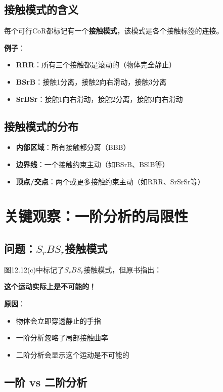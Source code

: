 \documentclass[12pt,a4paper]{article}
\begin{document}
\subsection{接触模式的含义}

每个可行CoR都标记有一个\textbf{接触模式}，该模式是各个接触标签的连接。

\textbf{例子}：
\begin{itemize}
\item \textbf{RRR}：所有三个接触都是滚动的（物体完全静止）
\item \textbf{BSrB}：接触1分离，接触2向右滑动，接触3分离
\item \textbf{SrBSr}：接触1向右滑动，接触2分离，接触3向右滑动
\end{itemize}

\subsection{接触模式的分布}

\begin{itemize}
\item \textbf{内部区域}：所有接触都分离（BBB）
\item \textbf{边界线}：一个接触约束主动（如BSrB、BSlB等）
\item \textbf{顶点/交点}：两个或更多接触约束主动（如RRR、SrSrSr等）
\end{itemize}

\section{关键观察：一阶分析的局限性}

\subsection{问题：$S_rBS_r$接触模式}

图12.12(c)中标记了$S_rBS_r$接触模式，但原书指出：

\textbf{这个运动实际上是不可能的！}

\textbf{原因}：
\begin{itemize}
\item 物体会立即穿透静止的手指
\item 一阶分析忽略了局部接触曲率
\item 二阶分析会显示这个运动是不可能的
\end{itemize}

\subsection{一阶 vs 二阶分析}
\end{document}
